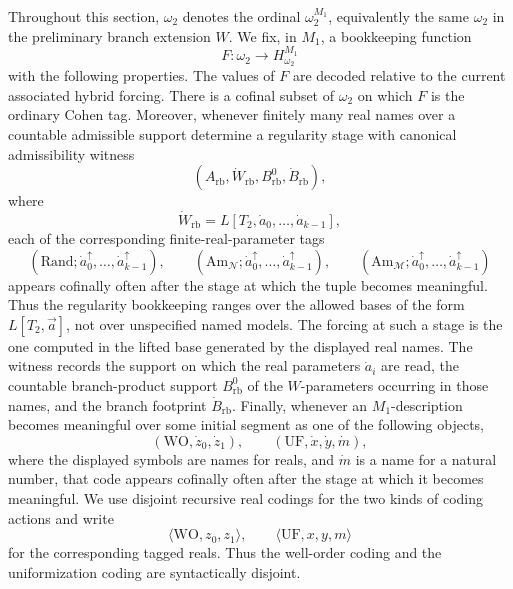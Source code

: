\documentclass[a4paper,11pt]{article}
\begin{document}
Throughout this section, \(\omega_2\) denotes the ordinal \(\omega_2^{M_1}\), equivalently the same \(\omega_2\) in the preliminary branch extension \(W\).  We fix, in $M_1$, a bookkeeping function
\[
   F:\omega_2\longrightarrow H_{\omega_2}^{M_1}
\]
with the following properties.  The values of $F$ are decoded relative to the
current associated hybrid forcing.  There is a cofinal subset of $\omega_2$ on
which $F$ is the ordinary Cohen tag.  Moreover, whenever finitely many real
names over a countable admissible support determine a regularity stage with
canonical admissibility witness
\[
   (A_{\mathrm{rb}},\dot W_{\mathrm{rb}},B^0_{\mathrm{rb}},\dot B_{\mathrm{rb}}),
\]
where
\[
   \dot W_{\mathrm{rb}}=L[T_2,\dot a_0,\ldots,
      \dot a_{k-1}],
\]
each of the corresponding finite-real-parameter tags
\[
   (\mathrm{Rand};\dot a_0^{\uparrow},\ldots,
      \dot a_{k-1}^{\uparrow}),
   \qquad
   (\mathrm{Am}_{\mathcal N};\dot a_0^{\uparrow},\ldots,
      \dot a_{k-1}^{\uparrow}),
   \qquad
   (\mathrm{Am}_{\mathcal M};\dot a_0^{\uparrow},\ldots,
      \dot a_{k-1}^{\uparrow})
\]
appears cofinally often after the stage at which the tuple becomes meaningful.
Thus the regularity bookkeeping ranges over the allowed bases of the form
\(L[T_2,\vec a]\), not over unspecified named models.  The forcing at such a
stage is the one computed in the lifted base generated by the displayed real
names.  The witness records the support on which the real parameters \(\dot a_i\)
are read, the countable branch-product support \(B^0_{\mathrm{rb}}\) of the
\(W\)-parameters occurring in those names, and the branch footprint
\(\dot B_{\mathrm{rb}}\).  Finally, whenever an $M_1$-description becomes
meaningful over some initial segment as one of the following objects,
\[
   (\mathrm{WO},\dot z_0,
   \dot z_1),
   \qquad
   (\mathrm{UF},\dot x,
   \dot y,
\dot m),
\]
where the displayed symbols are names for reals, and $\dot m$ is a name for a natural number, that code appears cofinally often after the stage at which it becomes meaningful.  We use disjoint recursive real codings for the two kinds of coding actions and write
\[
   \langle \mathrm{WO},z_0,z_1\rangle,
   \qquad
   \langle \mathrm{UF},x,y,m\rangle
\]
for the corresponding tagged reals.  Thus the well-order coding and the uniformization coding are syntactically disjoint.
\end{document}
